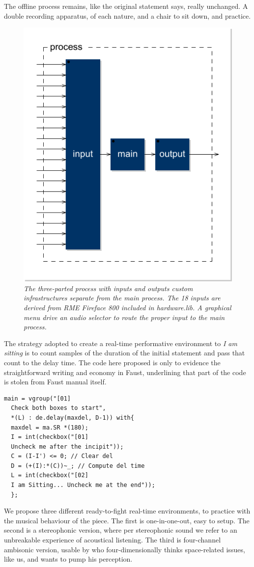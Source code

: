 \documentclass[twoside,a4paper]{article}
\begin{document}
The offline process remains, like the original statement says, really unchanged. A double recording apparatus, of each nature, and a chair to sit down, and practice. 

\begin{figure}[ht]
\centerline{\includegraphics[width=.45\textwidth]{img/lais-process}}
\caption{\label{re-dia-6c}{\it The three-parted process with inputs and outputs custom infrastructures separate from the main process. The 18 inputs are derived from \emph{RME Fireface 800} included in \emph{hardware.lib}. A graphical menu drive an audio selector to route the proper input to the main process.}}
\end{figure}

The strategy adopted to create a real-time performative environment to \emph{I am sitting} is to count samples of the duration of the initial statement and pass that count to the delay time. The code here proposed is only to evidence the straightforward writing and economy in Faust, underlining that part of the code is stolen from Faust manual itself. 

\begin{lstlisting}
main = vgroup("[01]
  Check both boxes to start",
  *(L) : de.delay(maxdel, D-1)) with{
  maxdel = ma.SR *(180);
  I = int(checkbox("[01]
  Uncheck me after the incipit"));
  C = (I-I') <= 0; // Clear del
  D = (+(I):*(C))~_; // Compute del time
  L = int(checkbox("[02]
  I am Sitting... Uncheck me at the end"));
  };
\end{lstlisting}

We propose three different ready-to-fight real-time environments, to practice with the musical behaviour of the piece. The first is one-in-one-out, easy to setup. The second is a stereophonic version, where per stereophonic sound we refer to an unbreakable experience of acoustical listening. The third is four-channel ambisonic version, usable by who four-dimensionally thinks space-related issues, like us, and wants to pump his perception. 
\end{document}

